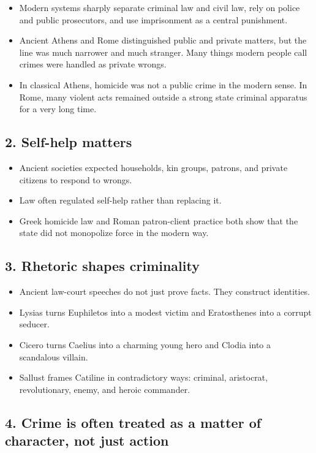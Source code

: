 \documentclass[11pt]{article}
\begin{document}
\begin{itemize}
\item Modern systems sharply separate criminal law and civil law, rely on police and public prosecutors, and use imprisonment as a central punishment.
\item Ancient Athens and Rome distinguished public and private matters, but the line was much narrower and much stranger. Many things modern people call crimes were handled as private wrongs.
\item In classical Athens, homicide was not a public crime in the modern sense. In Rome, many violent acts remained outside a strong state criminal apparatus for a very long time.
\end{itemize}

\subsection{2. Self-help matters}

\begin{itemize}
\item Ancient societies expected households, kin groups, patrons, and private citizens to respond to wrongs.
\item Law often regulated self-help rather than replacing it.
\item Greek homicide law and Roman patron-client practice both show that the state did not monopolize force in the modern way.
\end{itemize}

\subsection{3. Rhetoric shapes criminality}

\begin{itemize}
\item Ancient law-court speeches do not just prove facts. They construct identities.
\item Lysias turns Euphiletos into a modest victim and Eratosthenes into a corrupt seducer.
\item Cicero turns Caelius into a charming young hero and Clodia into a scandalous villain.
\item Sallust frames Catiline in contradictory ways: criminal, aristocrat, revolutionary, enemy, and heroic commander.
\end{itemize}

\subsection{4. Crime is often treated as a matter of character, not just action}
\end{document}
